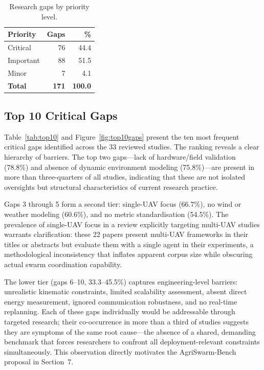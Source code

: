 \documentclass[review,3p,times]{elsarticle}
\begin{document}
\begin{table}[htbp]
\centering
\caption{Research gaps by priority level.}
\label{tab:gaps_priority}
\begin{tabular}{lrr}
\toprule
\textbf{Priority} & \textbf{Gaps} & \textbf{\%} \\
\midrule
Critical & 76 & 44.4 \\
Important & 88 & 51.5 \\
Minor & 7 & 4.1 \\
\midrule
\textbf{Total} & \textbf{171} & \textbf{100.0} \\
\bottomrule
\end{tabular}
\end{table}

\subsection{Top 10 Critical Gaps}
Table~\ref{tab:top10} and Figure~\ref{fig:top10gaps} present the ten most frequent critical gaps identified across the 33 reviewed studies. The ranking reveals a clear hierarchy of barriers. The top two gaps---lack of hardware/field validation (78.8\%) and absence of dynamic environment modeling (75.8\%)---are present in more than three-quarters of all studies, indicating that these are not isolated oversights but structural characteristics of current research practice.

Gaps 3 through 5 form a second tier: single-UAV focus (66.7\%), no wind or weather modeling (60.6\%), and no metric standardisation (54.5\%). The prevalence of single-UAV focus in a review explicitly targeting multi-UAV studies warrants clarification: these 22 papers present multi-UAV frameworks in their titles or abstracts but evaluate them with a single agent in their experiments, a methodological inconsistency that inflates apparent corpus size while obscuring actual swarm coordination capability.

The lower tier (gaps 6--10, 33.3--45.5\%) captures engineering-level barriers: unrealistic kinematic constraints, limited scalability assessment, absent direct energy measurement, ignored communication robustness, and no real-time replanning. Each of these gaps individually would be addressable through targeted research; their co-occurrence in more than a third of studies suggests they are symptoms of the same root cause---the absence of a shared, demanding benchmark that forces researchers to confront all deployment-relevant constraints simultaneously. This observation directly motivates the AgriSwarm-Bench proposal in Section~7.
\end{document}
